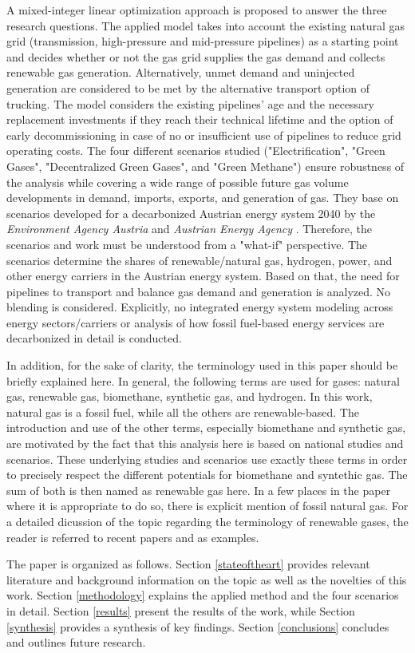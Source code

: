 A mixed-integer linear optimization approach is proposed to answer the three research questions. The applied model takes into account the existing natural gas grid (transmission, high-pressure and mid-pressure pipelines) as a starting point and decides whether or not the gas grid supplies the gas demand and collects renewable gas generation. Alternatively, unmet demand and uninjected generation are considered to be met by the alternative transport option of trucking. The model considers the existing pipelines' age and the necessary replacement investments if they reach their technical lifetime and the option of early decommissioning in case of no or insufficient use of pipelines to reduce grid operating costs. The four different scenarios studied ("Electrification", "Green Gases", "Decentralized Green Gases", and "Green Methane") ensure robustness of the analysis while covering a wide range of possible future gas volume developments in demand, imports, exports, and generation of gas. They base on scenarios developed for a decarbonized Austrian energy system 2040 by the \textit{Environment Agency Austria} \cite{umweltbundesamt} and \textit{Austrian Energy Agency} \cite{Energieagentur}. Therefore, the scenarios and work must be understood from a "what-if" perspective. The scenarios determine the shares of renewable/natural gas, hydrogen, power, and other energy carriers in the Austrian energy system. Based on that, the need for pipelines to transport and balance gas demand and generation is analyzed. No blending is considered. Explicitly, no integrated energy system modeling across energy sectors/carriers or analysis of how fossil fuel-based energy services are decarbonized in detail is conducted.\vspace{0.3cm}

In addition, for the sake of clarity, the terminology used in this paper should be briefly explained here. In general, the following terms are used for gases: natural gas, renewable gas, biomethane, synthetic gas, and hydrogen. In this work, natural gas is a fossil fuel, while all the others are renewable-based. The introduction and use of the other terms, especially biomethane and synthetic gas, are motivated by the fact that this analysis here is based on national studies and scenarios. These underlying studies and scenarios use exactly these terms in order to precisely respect the different potentials for biomethane and syntethic gas. The sum of both is then named as renewable gas here. In a few places in the paper where it is appropriate to do so, there is explicit mention of fossil natural gas. For a detailed dicussion of the topic regarding the terminology of renewable gases, the reader is referred to recent papers \cite{ridjan2016terminology} and \cite{legendre2023state} as examples.\vspace{0.3cm}

The paper is organized as follows. Section \ref{stateoftheart} provides relevant literature and background information on the topic as well as the novelties of this work. Section \ref{methodology} explains the applied method and the four scenarios in detail. Section \ref{results} present the results of the work, while Section \ref{synthesis} provides a synthesis of key findings. Section \ref{conclusions} concludes and outlines future research.